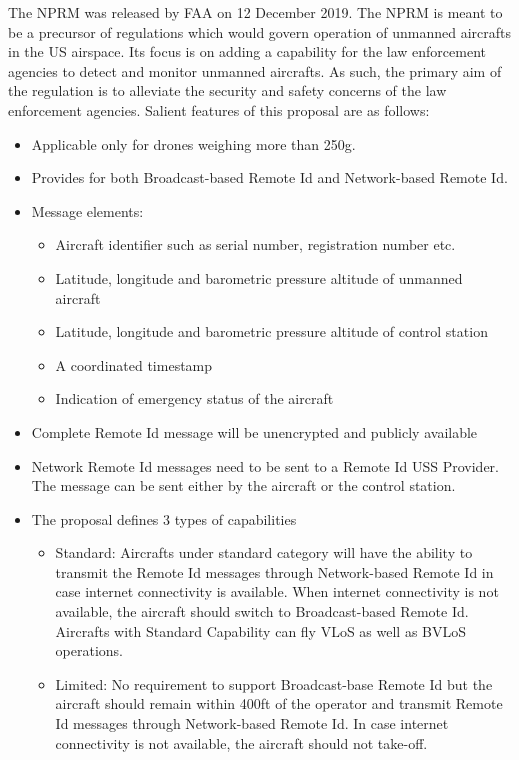 \documentclass{ua_wgs_base}
\begin{document}
The NPRM\cite{FAA-NPRM-2019-1100} was released by FAA on 12 December
2019. The NPRM is meant to be a precursor of regulations which would
govern operation of unmanned aircrafts in the US airspace. Its focus
is on adding a capability for the law enforcement agencies to detect
and monitor unmanned aircrafts. As such, the primary aim of the regulation
is to alleviate the security and safety concerns of the law enforcement
agencies. Salient features of this proposal are as follows:
\begin{itemize}
\item Applicable only for drones weighing more than 250g.
\item Provides for both Broadcast-based Remote Id and Network-based Remote
Id.
\item Message elements:
\begin{itemize}
\item Aircraft identifier such as serial number, registration number etc.
\item Latitude, longitude and barometric pressure altitude of unmanned aircraft
\item Latitude, longitude and barometric pressure altitude of control station
\item A coordinated timestamp
\item Indication of emergency status of the aircraft
\end{itemize}
\item Complete Remote Id message will be unencrypted and publicly available
\item Network Remote Id messages need to be sent to a Remote Id USS Provider.
The message can be sent either by the aircraft or the control station.
\item The proposal defines 3 types of capabilities
\begin{itemize}
\item Standard: Aircrafts under standard category will have the ability
to transmit the Remote Id messages through Network-based Remote Id
in case internet connectivity is available. When internet connectivity
is not available, the aircraft should switch to Broadcast-based Remote
Id. Aircrafts with Standard Capability can fly VLoS as well as BVLoS
operations.
\item Limited: No requirement to support Broadcast-base Remote Id but the
aircraft should remain within 400ft of the operator and transmit Remote
Id messages through Network-based Remote Id. In case internet connectivity
is not available, the aircraft should not take-off.

\end{itemize}
\end{itemize}
\end{document}

